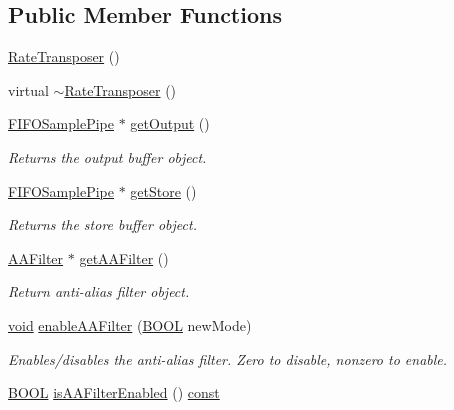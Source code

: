 \subsection*{Public Member Functions}
\begin{DoxyCompactItemize}
\item 
\hyperlink{classsoundtouch_1_1_rate_transposer_a942c0c31bfd4eedd69833cb963981f0a}{Rate\+Transposer} ()
\item 
virtual \hyperlink{classsoundtouch_1_1_rate_transposer_a3f23f4c8c03c88b248a093da0ea58fa9}{$\sim$\+Rate\+Transposer} ()
\item 
\hyperlink{classsoundtouch_1_1_f_i_f_o_sample_pipe}{F\+I\+F\+O\+Sample\+Pipe} $\ast$ \hyperlink{classsoundtouch_1_1_rate_transposer_aa2bb4c2053bc02d64666ccfa5482e431}{get\+Output} ()
\begin{DoxyCompactList}\small\item\em Returns the output buffer object. \end{DoxyCompactList}\item 
\hyperlink{classsoundtouch_1_1_f_i_f_o_sample_pipe}{F\+I\+F\+O\+Sample\+Pipe} $\ast$ \hyperlink{classsoundtouch_1_1_rate_transposer_a3f44bb47fa95e5959a9ddf9a33279d28}{get\+Store} ()
\begin{DoxyCompactList}\small\item\em Returns the store buffer object. \end{DoxyCompactList}\item 
\hyperlink{classsoundtouch_1_1_a_a_filter}{A\+A\+Filter} $\ast$ \hyperlink{classsoundtouch_1_1_rate_transposer_a8f5cadd6269b88a1c35e1f68af6fd106}{get\+A\+A\+Filter} ()
\begin{DoxyCompactList}\small\item\em Return anti-\/alias filter object. \end{DoxyCompactList}\item 
\hyperlink{sound_8c_ae35f5844602719cf66324f4de2a658b3}{void} \hyperlink{classsoundtouch_1_1_rate_transposer_af0b56fb4fced7d2a2daa92cbdf900c25}{enable\+A\+A\+Filter} (\hyperlink{nfilterkit_8h_a3be13892ae7076009afcf121347dd319}{B\+O\+OL} new\+Mode)
\begin{DoxyCompactList}\small\item\em Enables/disables the anti-\/alias filter. Zero to disable, nonzero to enable. \end{DoxyCompactList}\item 
\hyperlink{nfilterkit_8h_a3be13892ae7076009afcf121347dd319}{B\+O\+OL} \hyperlink{classsoundtouch_1_1_rate_transposer_a0de5acd51ed18638e9d76c0667d4f828}{is\+A\+A\+Filter\+Enabled} () \hyperlink{getopt1_8c_a2c212835823e3c54a8ab6d95c652660e}{const} 

\end{DoxyCompactItemize}
